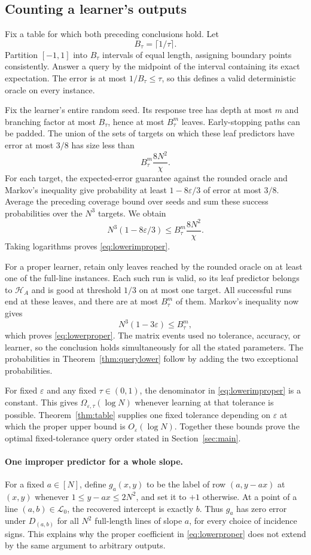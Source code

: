 \documentclass[11pt,letterpaper,pmlr,twoside]{jmlr}
\newcommand{\Hc}{\mathcal H}
\newcommand{\Lc}{\mathcal L}
\newcommand{\eps}{\varepsilon}
\newcommand{\ceil}[1]{\lceil #1\rceil}
\begin{document}
\subsection{Counting a learner's outputs}
Fix a table for which both preceding conclusions hold. Let
\[
 B_\tau=\ceil{1/\tau}.
\]
Partition $[-1,1]$ into $B_\tau$ intervals of equal length, assigning boundary points consistently. Answer a query by the midpoint of the interval containing its exact expectation. The error is at most $1/B_\tau\le\tau$, so this defines a valid deterministic oracle on every instance.

Fix the learner's entire random seed. Its response tree has depth at most $m$ and branching factor at most $B_\tau$, hence at most $B_\tau^m$ leaves. Early-stopping paths can be padded. The union of the sets of targets on which these leaf predictors have error at most $3/8$ has size less than
\[
 B_\tau^m\frac{8N^2}{\chi}.
\]
For each target, the expected-error guarantee against the rounded oracle and Markov's inequality give probability at least $1-8\eps/3$ of error at most $3/8$. Average the preceding coverage bound over seeds and sum these success probabilities over the $N^3$ targets. We obtain
\[
 N^3(1-8\eps/3)\le B_\tau^m\frac{8N^2}{\chi}.
\]
Taking logarithms proves \eqref{eq:lowerimproper}.

For a proper learner, retain only leaves reached by the rounded oracle on at least one of the full-line instances. Each such run is valid, so its leaf predictor belongs to $\Hc_A$ and is good at threshold $1/3$ on at most one target. All successful runs end at these leaves, and there are at most $B_\tau^m$ of them. Markov's inequality now gives
\[
 N^3(1-3\eps)\le B_\tau^m,
\]
which proves \eqref{eq:lowerproper}. The matrix events used no tolerance, accuracy, or learner, so the conclusion holds simultaneously for all the stated parameters. The probabilities in Theorem~\ref{thm:querylower} follow by adding the two exceptional probabilities.

For fixed $\eps$ and any fixed $\tau\in(0,1)$, the denominator in \eqref{eq:lowerimproper} is a constant. This gives $\Omega_{\eps,\tau}(\log N)$ whenever learning at that tolerance is possible. Theorem~\ref{thm:table} supplies one fixed tolerance depending on $\eps$ at which the proper upper bound is $O_\eps(\log N)$. Together these bounds prove the optimal fixed-tolerance query order stated in Section~\ref{sec:main}.

\paragraph{One improper predictor for a whole slope.}
For a fixed $a\in[N]$, define $g_a(x,y)$ to be the label of row $(a,y-ax)$ at $(x,y)$ whenever $1\le y-ax\le2N^2$, and set it to $+1$ otherwise. At a point of a line $(a,b)\in\Lc_0$, the recovered intercept is exactly $b$. Thus $g_a$ has zero error under $D_{(a,b)}$ for all $N^2$ full-length lines of slope $a$, for every choice of incidence signs. This explains why the proper coefficient in \eqref{eq:lowerproper} does not extend by the same argument to arbitrary outputs.
\end{document}
